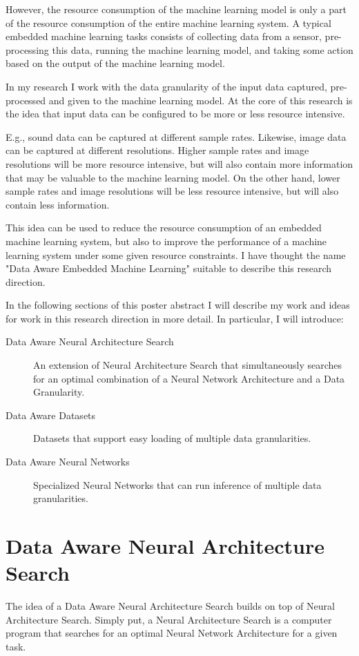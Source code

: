 \documentclass{acaces}
\begin{document}
However, the resource consumption of the machine learning model is only a part of the resource consumption of the entire machine learning system.
A typical embedded machine learning tasks consists of collecting data from a sensor, pre-processing this data, running the machine learning model, and taking some action based on the output of the machine learning model.

In my research I work with the data granularity of the input data captured, pre-processed and given to the machine learning model.
At the core of this research is the idea that input data can be configured to be more or less resource intensive.

E.g., sound data can be captured at different sample rates.
Likewise, image data can be captured at different resolutions.
Higher sample rates and image resolutions will be more resource intensive, but will also contain more information that may be valuable to the machine learning model.
On the other hand, lower sample rates and image resolutions will be less resource intensive, but will also contain less information.

This idea can be used to reduce the resource consumption of an embedded machine learning system, but also to improve the performance of a machine learning system under some given resource constraints.
I have thought the name "Data Aware Embedded Machine Learning" suitable to describe this research direction.

In the following sections of this poster abstract I will describe my work and ideas for work in this research direction in more detail.
In particular, I will introduce:
\begin{description}
    \item[Data Aware Neural Architecture Search] An extension of Neural Architecture Search that simultaneously searches for an optimal combination of a Neural Network Architecture and a Data Granularity.
    \item[Data Aware Datasets] Datasets that support easy loading of multiple data granularities.
    \item[Data Aware Neural Networks] Specialized Neural Networks that can run inference of multiple data granularities.
\end{description}

\section{Data Aware Neural Architecture Search}
The idea of a Data Aware Neural Architecture Search builds on top of Neural Architecture Search.
Simply put, a Neural Architecture Search is a computer program that searches for an optimal Neural Network Architecture for a given task.
\end{document}
